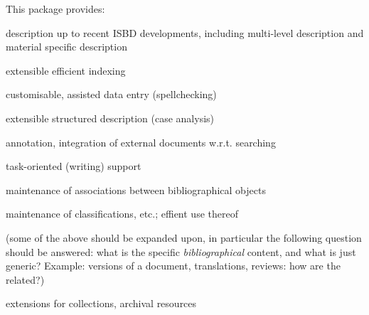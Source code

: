 This package provides:
\begin{itemize*}
\item description up to recent ISBD developments, including
  multi-level description and material specific description
\item extensible efficient indexing
\item customisable, assisted  data entry (spellchecking)
\item extensible structured description (case analysis)
\item annotation, integration of external documents w.r.t. searching
\item task-oriented (writing) support 
\item maintenance of associations between bibliographical objects
\item maintenance of classifications, etc.; effient use thereof
\item (some of the above should be expanded upon, in particular the
  following question should be answered: what is the specific
  \textit{bibliographical} content, and what is just generic?
  Example: versions of a document, translations, reviews: how are the
  related?)
\item extensions for collections, archival resources
\end{itemize*}


